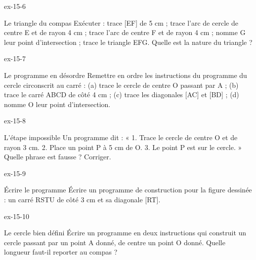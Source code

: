 \begin{blocLivre}{ex-15-6}\begin{exercice}[2]{Le triangle du compas}
Exécuter : trace [EF] de 5 cm ; trace l’arc de cercle de centre E et de rayon 4 cm ; trace l’arc de centre F et de rayon 4 cm ; nomme G leur point d’intersection ; trace le triangle EFG. Quelle est la nature du triangle ?
\label{fig-ex-15-6}
\end{exercice}\end{blocLivre}
\begin{blocLivre}{ex-15-7}\begin{exercice}[2]{Le programme en désordre}
Remettre en ordre les instructions du programme du cercle circonscrit au carré : (a) trace le cercle de centre O passant par A ; (b) trace le carré ABCD de côté 4 cm ; (c) trace les diagonales [AC] et [BD] ; (d) nomme O leur point d’intersection.
\label{fig-ex-15-7}
\end{exercice}\end{blocLivre}
\begin{blocLivre}{ex-15-8}\begin{exercice}[2]{L’étape impossible}
Un programme dit : « 1. Trace le cercle de centre O et de rayon 3 cm. 2. Place un point P à 5 cm de O. 3. Le point P est sur le cercle. » Quelle phrase est fausse ? Corriger.
\label{fig-ex-15-8}
\end{exercice}\end{blocLivre}
\begin{blocLivre}{ex-15-9}\begin{exercice}[2]{Écrire le programme}
Écrire un programme de construction pour la figure dessinée : un carré RSTU de côté 3 cm et sa diagonale [RT].
\label{fig-ex-15-9}
\end{exercice}\end{blocLivre}
\begin{blocLivre}{ex-15-10}\begin{exercice}[2]{Le cercle bien défini}
Écrire un programme en deux instructions qui construit un cercle passant par un point A donné, de centre un point O donné. Quelle longueur faut-il reporter au compas ?
\label{fig-ex-15-10}
\end{exercice}\end{blocLivre}

